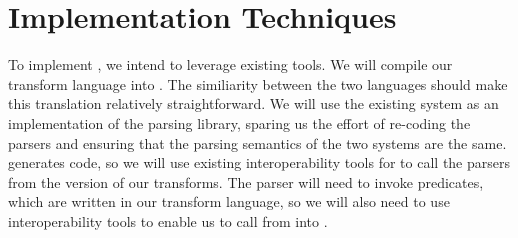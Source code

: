 \section{Implementation Techniques}
\label{sec:implementation-techniques}
To implement \padsml{}, we intend to leverage existing tools.  
We will compile our transform language into \sml{}.  The similiarity
between the two languages should make this translation relatively
straightforward.  We will use the existing \padsc{} system as an
implementation of the parsing library, sparing us the effort of
re-coding the parsers and ensuring that the parsing semantics of the
two systems are the same.  \padsc{} generates \C{} code, so we will
use existing interoperability tools for \sml{} to call the \C{}
parsers from the \ml{} version of our transforms.  The parser will
need to invoke \padsml{} predicates, which are written in our
transform language, so we will also need to use interoperability tools
to enable us to call from \C{} into \sml{}.

